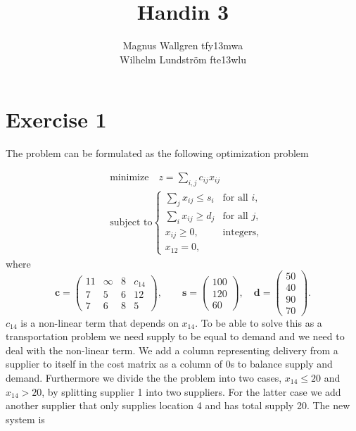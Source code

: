 \documentclass[a4paper]{article}
\title{Handin 3}
\author{Magnus Wallgren tfy13mwa\\ Wilhelm Lundström fte13wlu}
\begin{document}
\maketitle
\section*{Exercise 1}
The problem can be formulated as the following optimization problem


\begin{align}
&\text{minimize}\quad z = \sum_{i,j} c_{ij} x_{ij}\\
&\text{subject to} 
\begin{cases}
\sum_j x_{ij} \leq s_i  &\text{for all } i,\\
\sum_i x_{ij} \geq d_j &\text{for all } j,\\
x_{ij} \geq 0, &\text{integers},\\
x_{12} = 0, 
\end{cases}
\end{align}
where
$$\mathbf{c} = 
\left(
\begin{array}{cccc}
11 & \infty & 8 & c_{14}\\
7 & 5 & 6 & 12\\
7 & 6 & 8 & 5
\end{array}
\right), \quad
\quad \mathbf{s} = 
\left(
\begin{array}{c}
100\\120\\60
\end{array}
\right),\quad \mathbf{d} = 
\left( 
\begin{array}{c}
50\\40\\90\\70
\end{array}
\right).
$$
$c_{14}$ is a non-linear term that depends on $x_{14}$. To be able to solve this as a transportation problem we need supply to be equal to demand and we need to deal with the non-linear term. We add a column representing delivery from a supplier to itself in the cost matrix as a column of 0s to balance supply and demand. Furthermore we divide the the problem into two cases, $x_{14} \leq 20$ and $x_{14} > 20$, by splitting supplier 1 into two suppliers. For the latter case we add another supplier that  only supplies location 4 and has total supply 20. The new system is
\end{document}
